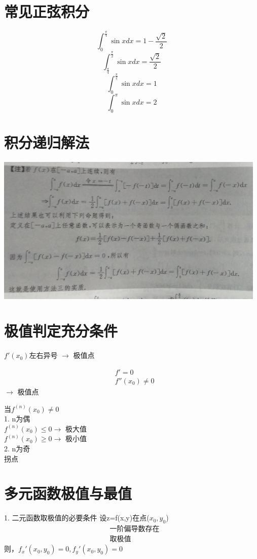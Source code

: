 \documentclass[UTF8]{ctexart}
\begin{document}
\section{常见正弦积分}

$$ \int_0^\frac{\pi}{4} \sin x dx =1- \frac{\sqrt{2}}{2}$$
$$ \int_\frac{\pi}{4}^\frac{\pi}{2} \sin x dx =\frac{\sqrt{2}}{2}$$
$$ \int_0^\frac{\pi}{2} \sin x dx = 1$$
$$ \int_0^\pi \sin x dx =2$$

\section{积分递归解法}
\includegraphics[width=13cm]{9345E7/2002379869.jpg}

\section{极值判定充分条件}
$f '(x_0)$左右异号 $\rightarrow$ 极值点

\begin{align}
&f'=0 \\
&f''(x_0) \neq 0
\end{align}
$\rightarrow$ 极值点

当$ f^{(n)} (x_0) \neq 0$ \\
1. n为偶   \\
    $f^{(n)} (x_0) \leq 0 \rightarrow $ 极大值  \\
    $f^{(n)} (x_0) \geq 0 \rightarrow $ 极小值  \\
    2. n为奇  \\
        拐点  \\

\section{多元函数极值与最值}
1. 二元函数取极值的必要条件
设z=f(x,y)在点($x_0,y_0$) \\
\begin{align}
&\mbox{一阶偏导数存在}\\
&\mbox{取极值}
\end{align}则，$ f_x' (x_0 , y_0)=0 , f_y' (x_0 , y_0)=0 $
\end{document}
